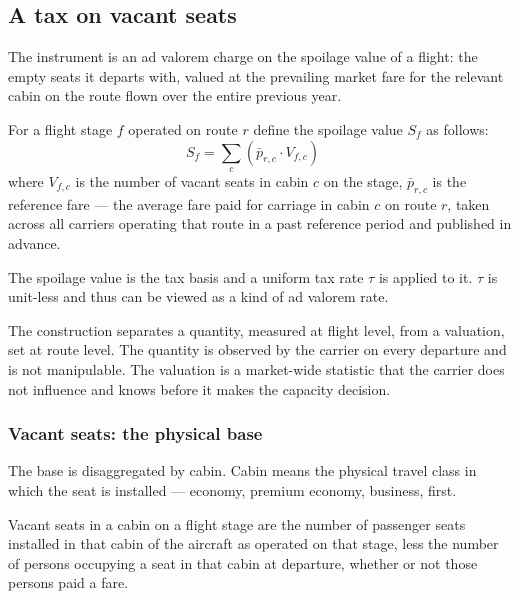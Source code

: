 \documentclass{article}
\begin{document}
\subsection{A tax on vacant seats}
The instrument is an ad valorem charge on the spoilage value of a flight: the empty seats it departs with, valued at the prevailing market fare for the relevant cabin on the route flown over the entire previous year.

For a flight stage $f$ operated on route $r$ define the spoilage value $S_f$ as follows:
\[
S_f = \sum_c \left( \bar{p}_{r,c} \cdot V_{f,c} \right) \quad 
\]
where $V_{f,c}$ is the number of vacant seats in cabin $c$ on the stage, $\bar{p}_{r,c}$ is the reference fare --- the average fare paid for carriage in cabin $c$ on route $r$, taken across all carriers operating that route in a past reference period and published in advance.

The spoilage value is the tax basis and a uniform tax rate $\tau$ is applied to it. $\tau$ is unit-less and thus can be viewed as a kind of ad valorem rate.

The construction separates a quantity, measured at flight level, from a valuation, set at route level. The quantity is observed by the carrier on every departure and is not manipulable. The valuation is a market-wide statistic that the carrier does not influence and knows before it makes the capacity decision. 


\subsubsection{Vacant seats: the physical base}
The base is disaggregated by cabin. Cabin means the physical travel class in which the seat is installed --- economy, premium economy, business, first.

Vacant seats in a cabin on a flight stage are the number of passenger seats installed in that cabin of the aircraft as operated on that stage, less the number of persons occupying a seat in that cabin at departure, whether or not those persons paid a fare.
\end{document}
